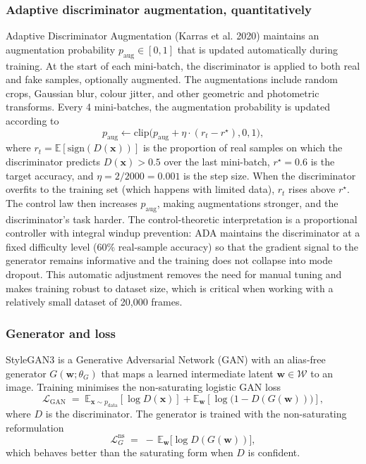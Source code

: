 \documentclass{article}
\begin{document}
\subsubsection*{Adaptive discriminator augmentation, quantitatively}

Adaptive Discriminator Augmentation (Karras et al. 2020) maintains an augmentation probability $p_\text{aug} \in [0, 1]$ that is updated automatically during training. At the start of each mini-batch, the discriminator is applied to both real and fake samples, optionally augmented. The augmentations include random crops, Gaussian blur, colour jitter, and other geometric and photometric transforms. Every 4 mini-batches, the augmentation probability is updated according to
$$p_\text{aug} \gets \mathrm{clip}\!\bigl(p_\text{aug} + \eta \cdot (r_t - r^\star), 0, 1\bigr),$$
where $r_t = \mathbb{E}[\mathrm{sign}(D(\mathbf{x})\!)]$ is the proportion of real samples on which the discriminator predicts $D(\mathbf{x}) > 0.5$ over the last mini-batch, $r^\star = 0.6$ is the target accuracy, and $\eta = 2 / 2000 = 0.001$ is the step size. When the discriminator overfits to the training set (which happens with limited data), $r_t$ rises above $r^\star$. The control law then increases $p_\text{aug}$, making augmentations stronger, and the discriminator's task harder. The control-theoretic interpretation is a proportional controller with integral windup prevention: ADA maintains the discriminator at a fixed difficulty level (60\% real-sample accuracy) so that the gradient signal to the generator remains informative and the training does not collapse into mode dropout. This automatic adjustment removes the need for manual tuning and makes training robust to dataset size, which is critical when working with a relatively small dataset of 20{,}000 frames.

\subsubsection*{Generator and loss}

StyleGAN3 is a Generative Adversarial Network (GAN) with an alias-free generator $G(\mathbf{w}; \theta_G)$ that maps a learned intermediate latent $\mathbf{w} \in \mathcal{W}$ to an image. Training minimises the non-saturating logistic GAN loss
\begin{equation}
\mathcal{L}_\text{GAN} \;=\; \mathbb{E}_{\mathbf{x} \sim p_\text{data}}\!\left[\log D(\mathbf{x})\right] + \mathbb{E}_{\mathbf{w}}\!\left[\log\!\bigl(1 - D(G(\mathbf{w}))\bigr)\right],
\label{eq:gan-loss}
\end{equation}
where $D$ is the discriminator. The generator is trained with the non-saturating reformulation
\begin{equation*}
\mathcal{L}_G^{\mathrm{ns}} \;=\; -\,\mathbb{E}_{\mathbf{w}}\bigl[\log D(G(\mathbf{w}))\bigr],
\end{equation*}
which behaves better than the saturating form when $D$ is confident.
\end{document}
